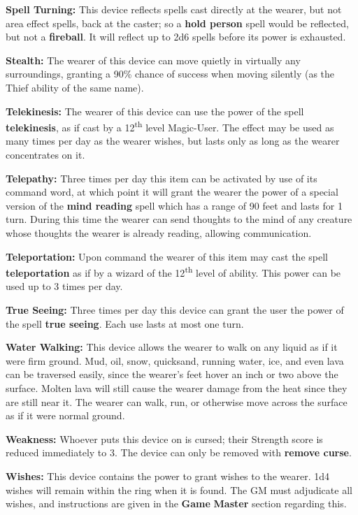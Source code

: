 \documentclass[a4paper,twoside,openany,10pt]{book}
\begin{document}
\begin{multicols}{2}
\textbf{Spell Turning:} This device reflects spells cast directly at the wearer, but not area effect spells, back at the caster; so a \textbf{hold person} spell would be reflected, but not a \textbf{fireball}. It will reflect up to 2d6 spells before its power is exhausted.

\textbf{Stealth:} The wearer of this device can move quietly in virtually any surroundings, granting a 90\% chance of success when moving silently (as the Thief ability of the same name).

\textbf{Telekinesis:} The wearer of this device can use the power of the spell \textbf{telekinesis}, as if cast by a 12\textsuperscript{th} level Magic-User. The effect may be used as many times per day as the wearer wishes, but lasts only as long as the wearer concentrates on it.

\textbf{Telepathy:} Three times per day this item can be activated by use of its command word, at which point it will grant the wearer the power of a special version of the \textbf{mind reading} spell which has a range of 90 feet and lasts for 1 turn. During this time the wearer can send thoughts to the mind of any creature whose thoughts the wearer is already reading, allowing communication.

\textbf{Teleportation:} Upon command the wearer of this item may cast the spell \textbf{teleportation} as if by a wizard of the 12\textsuperscript{th} level of ability. This power can be used up to 3 times per day.

\textbf{True Seeing:} Three times per day this device can grant the user the power of the spell \textbf{true seeing}. Each use lasts at most one turn.

\textbf{Water Walking:} This device allows the wearer to walk on any liquid as if it were firm ground. Mud, oil, snow, quicksand, running water, ice, and even lava can be traversed easily, since the wearer's feet hover an inch or two above the surface. Molten lava will still cause the wearer damage from the heat since they are still near it. The wearer can walk, run, or otherwise move across the surface as if it were normal ground.

\textbf{Weakness:} Whoever puts this device on is cursed; their Strength score is reduced immediately to 3. The device can only be removed with \textbf{remove curse}. 

\textbf{Wishes:} This device contains the power to grant wishes to the wearer. 1d4 wishes will remain within the ring when it is found. The GM must adjudicate all wishes, and instructions are given in the \textbf{Game} \textbf{Master} section regarding this. 



\end{multicols}
\end{document}
